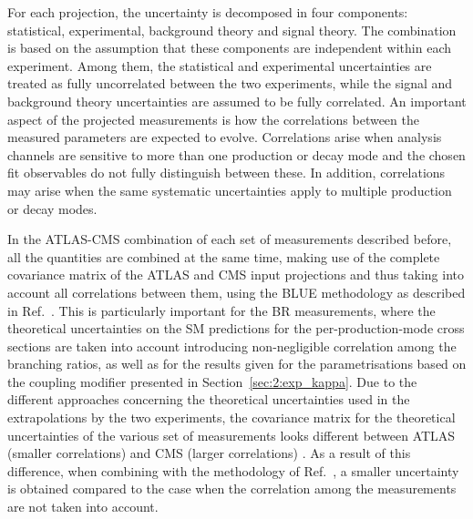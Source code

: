 For each projection, the uncertainty is decomposed in four components: statistical, experimental, background theory and signal theory.
The combination is based on the assumption that these components are independent within each experiment. Among them, the statistical and experimental uncertainties are treated as fully uncorrelated between the two experiments, while the signal and background theory uncertainties are assumed to be fully correlated. An important aspect of the projected measurements is how the correlations between the measured parameters are expected to evolve. Correlations arise when analysis channels are sensitive to more than one production or decay mode and the chosen fit observables do not fully distinguish between these. 
In addition, correlations may arise when the same systematic uncertainties apply to multiple production or decay modes.


In the ATLAS-CMS combination of each set of measurements  described before, all the quantities are combined at the same time, making use of the complete covariance matrix of the ATLAS and CMS input projections and thus taking into account all correlations between them, using the BLUE methodology as described in Ref.~\cite{Valassi:2003mu}. This is particularly important for the BR measurements, where the theoretical uncertainties on the SM predictions for the per-production-mode cross sections are taken into account introducing non-negligible correlation among the branching ratios, as well as for the results given for the parametrisations based on the coupling modifier presented in Section~\ref{sec:2:exp_kappa}.
Due to the different approaches concerning the theoretical uncertainties used in the extrapolations by the two experiments, the covariance matrix for the theoretical uncertainties of the various set of measurements looks  different between ATLAS (smaller correlations) and CMS (larger correlations) . As a result of this difference, when combining with the methodology of Ref.~\cite{Valassi:2003mu}, a smaller uncertainty is obtained compared to the case when the correlation among the measurements are not taken into account. 



